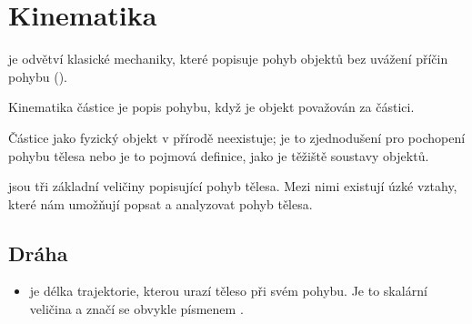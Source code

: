 \documentclass[letterpaper,10pt,english]{jupyterBook}
\begin{document}
\section{Kinematika}
\label{\detokenize{Prednasky/1_2_Kinematika_v_1D:kinematika}}
\sphinxAtStartPar
{} je odvětví klasické mechaniky, které popisuje pohyb objektů bez uvážení příčin pohybu ().

\sphinxAtStartPar
Kinematika částice je popis pohybu, když je objekt považován za částici.

\sphinxAtStartPar
Částice jako fyzický objekt v přírodě neexistuje; je to zjednodušení pro pochopení pohybu tělesa nebo je to pojmová definice, jako je těžiště soustavy objektů.

\sphinxAtStartPar
{} jsou tři základní veličiny popisující pohyb tělesa. Mezi nimi existují úzké vztahy, které nám umožňují popsat a analyzovat pohyb tělesa.


\subsection{Dráha}
\label{\detokenize{Prednasky/1_2_Kinematika_v_1D:draha}}\begin{itemize}
\item {} 
\sphinxAtStartPar
{} je délka trajektorie, kterou urazí těleso při svém pohybu. Je to skalární veličina a značí se obvykle písmenem .

\end{itemize}
\end{document}
